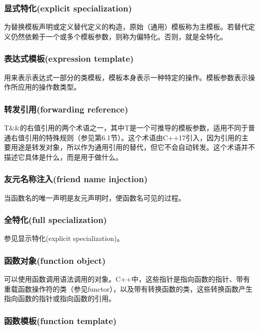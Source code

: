\subsubsection{显式特化(explicit specialization)}

为替换模板声明或定义替代定义的构造，原始（通用）模板称为主模板。若替代定义仍然依赖于一个或多个模板参数，则称为偏特化。否则，就是全特化。

\subsubsection{表达式模板(expression template)}

用来表示表达式一部分的类模板，模板本身表示一种特定的操作。模板参数表示操作所应用的操作数类型。

\subsubsection{转发引用(forwarding reference)}

T\&\&的右值引用的两个术语之一，其中T是一个可推导的模板参数，适用不同于普通右值引用的特殊规则（参见第6.1节）。这个术语由C++17引入，因为引用的主要用途是转发对象，所以作为通用引用的替代，但它不会自动转发。这个术语并不描述它具体是什么，而是用于做什么。

\subsubsection{友元名称注入(friend name injection)}

当函数名的唯一声明是友元声明时，使函数名可见的过程。

\subsubsection{全特化(full specialization)}

参见显示特化(explicit specialization)。

\subsubsection{函数对象(function object)}

可以使用函数调用语法调用的对象。C++中，这些指针是指向函数的指针、带有重载函数操作符的类（参见functor），以及带有转换函数的类，这些转换函数产生指向函数的指针或指向函数的引用。

\subsubsection{函数模板(function template)}

